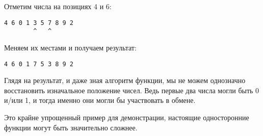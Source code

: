 Отметим числа на позициях 4 и 6:

\begin{lstlisting}
4 6 0 1 3 5 7 8 9 2
        ^   ^
\end{lstlisting}

Меняем их местами и получаем результат:

\begin{lstlisting}
4 6 0 1 7 5 3 8 9 2
\end{lstlisting}

Глядя на результат, и даже зная алгоритм функции, мы не можем однозначно восстановить изначальное
положение чисел.
Ведь первые два числа могли быть 0 и/или 1, и тогда именно они могли бы участвовать в обмене.

Это крайне упрощенный пример для демонстрации, настоящие односторонние функции могут быть значительно сложнее.
